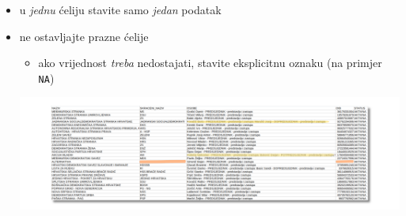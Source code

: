 \documentclass[aspectratio=169]{beamer}
\begin{document}
\begin{frame}
    \begin{itemize}
        \setlength{\itemsep}{2em}

        \item u \textit{jednu} ćeliju stavite samo \textit{jedan} podatak

        \item ne ostavljajte prazne ćelije

            \begin{itemize}
                \item ako vrijednost \textit{treba} nedostajati, stavite
                    eksplicitnu oznaku (na primjer \texttt{NA})

            \end{itemize}

        \vspace{1.5em}

        \includegraphics[scale=.27]{images/messy-politics.png}
    \end{itemize}
\end{frame}
\end{document}
